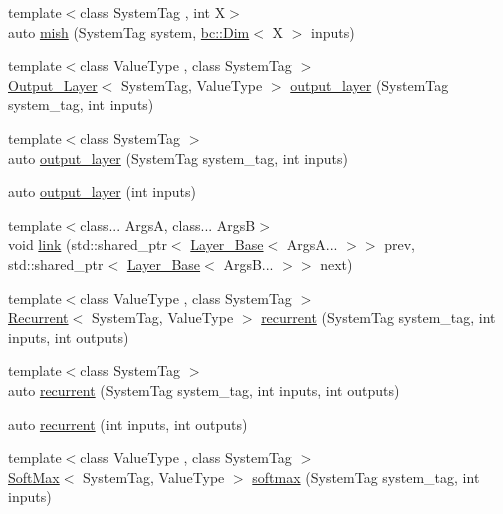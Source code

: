 \begin{DoxyCompactItemize}
\item 
{\footnotesize template$<$class System\+Tag , int X$>$ }\\auto \hyperlink{namespacebc_1_1nn_afb1231c7a3de4aec64f3de944173df84}{mish} (System\+Tag system, \hyperlink{structbc_1_1Dim}{bc\+::\+Dim}$<$ X $>$ inputs)
\item 
{\footnotesize template$<$class Value\+Type , class System\+Tag $>$ }\\\hyperlink{structbc_1_1nn_1_1Output__Layer}{Output\+\_\+\+Layer}$<$ System\+Tag, Value\+Type $>$ \hyperlink{namespacebc_1_1nn_ae84edaf9ec82c2af64a8f3aa54b4828e}{output\+\_\+layer} (System\+Tag system\+\_\+tag, int inputs)
\item 
{\footnotesize template$<$class System\+Tag $>$ }\\auto \hyperlink{namespacebc_1_1nn_abbaad8d9e2085fa6e976f944b7e9e894}{output\+\_\+layer} (System\+Tag system\+\_\+tag, int inputs)
\item 
auto \hyperlink{namespacebc_1_1nn_a56a762fa913ca0ac7399cae1713b9d5a}{output\+\_\+layer} (int inputs)
\item 
{\footnotesize template$<$class... ArgsA, class... ArgsB$>$ }\\void \hyperlink{namespacebc_1_1nn_ad126cb88738312204f33d5e21a03bf06}{link} (std\+::shared\+\_\+ptr$<$ \hyperlink{structbc_1_1nn_1_1Layer__Base}{Layer\+\_\+\+Base}$<$ Args\+A... $>$$>$ prev, std\+::shared\+\_\+ptr$<$ \hyperlink{structbc_1_1nn_1_1Layer__Base}{Layer\+\_\+\+Base}$<$ Args\+B... $>$$>$ next)
\item 
{\footnotesize template$<$class Value\+Type , class System\+Tag $>$ }\\\hyperlink{structbc_1_1nn_1_1Recurrent}{Recurrent}$<$ System\+Tag, Value\+Type $>$ \hyperlink{namespacebc_1_1nn_ae3f19f032dee5e9dd4916e0caf6ae21b}{recurrent} (System\+Tag system\+\_\+tag, int inputs, int outputs)
\item 
{\footnotesize template$<$class System\+Tag $>$ }\\auto \hyperlink{namespacebc_1_1nn_af907049010c811e5f6d1f094935e8b07}{recurrent} (System\+Tag system\+\_\+tag, int inputs, int outputs)
\item 
auto \hyperlink{namespacebc_1_1nn_ad12df9d8a92450f4ed84d3ccf0144ef9}{recurrent} (int inputs, int outputs)
\item 
{\footnotesize template$<$class Value\+Type , class System\+Tag $>$ }\\\hyperlink{structbc_1_1nn_1_1SoftMax}{Soft\+Max}$<$ System\+Tag, Value\+Type $>$ \hyperlink{namespacebc_1_1nn_a02fb410ce3a9154636fa6dd70be6c573}{softmax} (System\+Tag system\+\_\+tag, int inputs)

\end{DoxyCompactItemize}
